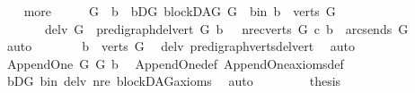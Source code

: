 \begin{isabellebody}
\ \ \isamarkupfalse%
\ more\isanewline
\ \ \isamarkupfalse%
\ \isamarkupfalse%
\ G{}\ \ b\ \ bD{\isacharunderscore}{\kern0pt}G{}{\isacharcolon}{\kern0pt}\ {\isachardoublequoteopen}blockDAG\ G{}{\isachardoublequoteclose}\ \ b{\isacharunderscore}{\kern0pt}in{\isacharcolon}{\kern0pt}\ {\isachardoublequoteopen}b\ {\isasymin}\ verts\ G{\isachardoublequoteclose}\isanewline
\ \ \ \ \ \ \ del{\isacharunderscore}{\kern0pt}v{\isacharcolon}{\kern0pt}\ {\isachardoublequoteopen}G{}\ {\isacharequal}{\kern0pt}\ pre{\isacharunderscore}{\kern0pt}digraph{\isachardot}{\kern0pt}del{\isacharunderscore}{\kern0pt}vert\ G\ b\ {\isachardoublequoteclose}\ \ nre{\isacharcolon}{\kern0pt}{\isachardoublequoteopen}{\isacharparenleft}{\kern0pt}{\isasymforall}c{\isasymin}verts\ G{\isachardot}{\kern0pt}\ {\isacharparenleft}{\kern0pt}c{\isacharcomma}{\kern0pt}\ b{\isacharparenright}{\kern0pt}\ {\isasymnotin}\ {\isacharparenleft}{\kern0pt}arcs{\isacharunderscore}{\kern0pt}ends\ G{\isacharparenright}{\kern0pt}\isactrlsup {\isacharplus}{\kern0pt}{\isacharparenright}{\kern0pt}{\isachardoublequoteclose}\isanewline
\ \ \ \ \ \ \isamarkupfalse%
\ auto\isanewline
\ \ \ \ \isamarkupfalse%
\ \isamarkupfalse%
\ {\isachardoublequoteopen}b\ {\isasymnotin}\ verts\ G{}{\isachardoublequoteclose}\ \isamarkupfalse%
\ del{\isacharunderscore}{\kern0pt}v\ pre{\isacharunderscore}{\kern0pt}digraph{\isachardot}{\kern0pt}verts{\isacharunderscore}{\kern0pt}del{\isacharunderscore}{\kern0pt}vert\ \isamarkupfalse%
\ auto\isanewline
\ \ \ \ \isamarkupfalse%
\ \isamarkupfalse%
\ {\isachardoublequoteopen}Append{\isacharunderscore}{\kern0pt}One\ G{}\ G\ b{\isachardoublequoteclose}\ \isamarkupfalse%
\ Append{\isacharunderscore}{\kern0pt}One{\isacharunderscore}{\kern0pt}def\ Append{\isacharunderscore}{\kern0pt}One{\isacharunderscore}{\kern0pt}axioms{\isacharunderscore}{\kern0pt}def\ \isanewline
\ \ \ \ \ \ \isamarkupfalse%
\ bD{\isacharunderscore}{\kern0pt}G{}\ b{\isacharunderscore}{\kern0pt}in\ del{\isacharunderscore}{\kern0pt}v\ nre\ blockDAG{\isacharunderscore}{\kern0pt}axioms\ \isamarkupfalse%
\ auto\ \ \ \isanewline
\ \ \isamarkupfalse%
\ \isamarkupfalse%
\ {\isacharquery}{\kern0pt}thesis\ \isamarkupfalse%

\end{isabellebody}
